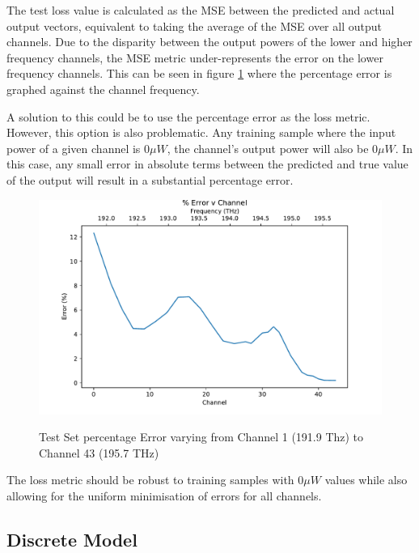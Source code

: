 The test loss value is calculated as the MSE between the predicted and actual output vectors, equivalent to taking the average of the MSE over all output channels. Due to the disparity between the output powers of the lower and higher frequency channels, the MSE metric under-represents the error on the lower frequency channels. This can be seen in figure \ref{fig:ml_model:pct_err_freq} where the percentage error is graphed against the channel frequency.

A solution to this could be to use the percentage error as the loss metric. However, this option is also problematic. Any training sample where the input power of a  given channel is $0 \mu W$, the channel's output power will also be $0\mu W$. In this case, any small error in absolute terms between the predicted and true value of the output will result in a substantial percentage error.

\begin{figure}[!h]
    \centering
    \caption{Test Set percentage Error varying from Channel 1 (191.9 Thz) to Channel 43 (195.7 THz)}
    \includegraphics[width = \textwidth]{project/img/ml_model/combined/pct_err_freq.pdf}
    \label{fig:ml_model:pct_err_freq}
\end{figure}

The loss metric should be robust to training samples with $0\mu W$ values while also allowing for the uniform minimisation of errors for all channels. 



\FloatBarrier
\subsection{Discrete Model} \label{sub:sec:disc_mod}

